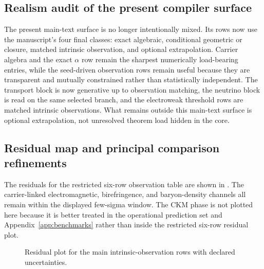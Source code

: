 \documentclass[11pt,a4paper]{article}
\theoremstyle{definition}
\theoremstyle{remark}
\begin{document}
\subsection{Realism audit of the present compiler surface}

The present main-text surface is no longer intentionally mixed. Its rows now use the manuscript's
four final classes: exact algebraic, conditional geometric or closure, matched intrinsic
observation, and optional extrapolation. Carrier algebra and the exact $\alpha$ row remain the
sharpest numerically load-bearing entries, while the seed-driven observation rows remain useful
because they are transparent and mutually constrained rather than statistically independent. The
transport block is now generative up to observation matching, the neutrino block is read on the
same selected branch, and the electroweak threshold rows are matched intrinsic observations.
What remains outside this main-text surface is optional extrapolation, not unresolved theorem
load hidden in the core.

\subsection{Residual map and principal comparison refinements}

The residuals for the restricted six-row observation table are shown in
. The carrier-linked electromagnetic, birefringence, and baryon-density
channels all remain within the displayed few-sigma window. The CKM phase is not plotted here
because it is better treated in the operational prediction set and Appendix~\ref{app:benchmarks}
rather than inside the restricted six-row residual plot.

\begin{figure}[t]
\centering
{}
\caption{Residual plot for the main intrinsic-observation rows with declared uncertainties.}
\label{fig:residual-plot}
\end{figure}
\end{document}

